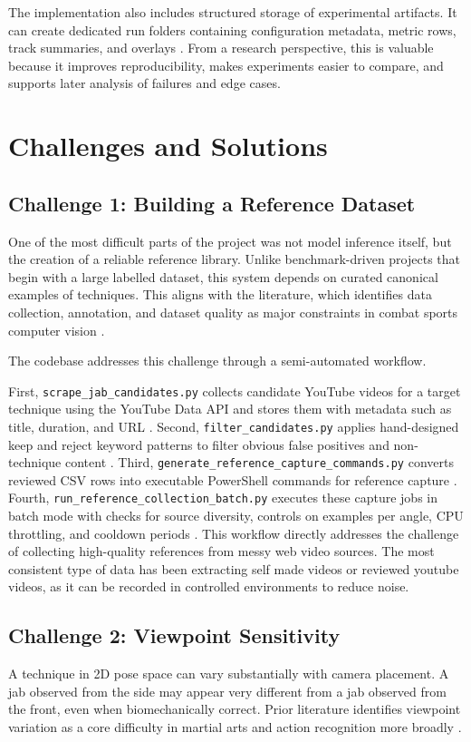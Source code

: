 \documentclass[12pt]{article}
\begin{document}
The implementation also includes structured storage of experimental artifacts. It can create dedicated run folders containing configuration metadata, metric rows, track summaries, and overlays \cite{projectActionRecognition}. From a research perspective, this is valuable because it improves reproducibility, makes experiments easier to compare, and supports later analysis of failures and edge cases.

\section{Challenges and Solutions}
\subsection{Challenge 1: Building a Reference Dataset}
One of the most difficult parts of the project was not model inference itself, but the creation of a reliable reference library. Unlike benchmark-driven projects that begin with a large labelled dataset, this system depends on curated canonical examples of techniques. This aligns with the literature, which identifies data collection, annotation, and dataset quality as major constraints in combat sports computer vision \cite{quinn2024automation,quinn2025yolo}.

The codebase addresses this challenge through a semi-automated workflow. 

First, \texttt{scrape\_jab\_candidates.py} collects candidate YouTube videos for a target technique using the YouTube Data API and stores them with metadata such as title, duration, and URL \cite{projectScrape}. Second, \texttt{filter\_candidates.py} applies hand-designed keep and reject keyword patterns to filter obvious false positives and non-technique content \cite{projectFilter}. Third, \texttt{generate\_reference\_capture\_commands.py} converts reviewed CSV rows into executable PowerShell commands for reference capture \cite{projectGenerate}. Fourth, \texttt{run\_reference\_collection\_batch.py} executes these capture jobs in batch mode with checks for source diversity, controls on examples per angle, CPU throttling, and cooldown periods \cite{projectRunBatch}. This workflow directly addresses the challenge of collecting high-quality references from messy web video sources.
The most consistent type of data has been extracting self made videos or reviewed youtube videos, as it can be recorded in controlled environments to reduce noise.

\subsection{Challenge 2: Viewpoint Sensitivity}
A technique in 2D pose space can vary substantially with camera placement. A jab observed from the side may appear very different from a jab observed from the front, even when biomechanically correct. Prior literature identifies viewpoint variation as a core difficulty in martial arts and action recognition more broadly \cite{wu2024sthka,echeverria2021pose}.
\end{document}
